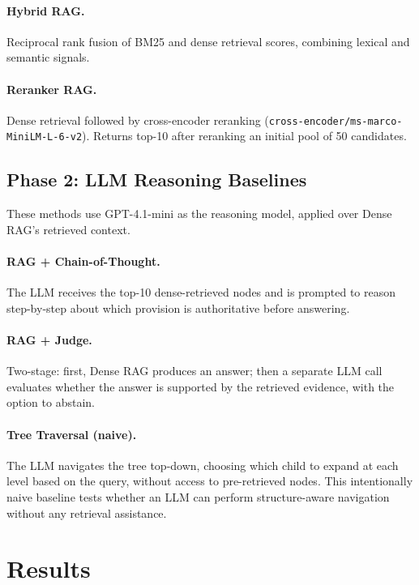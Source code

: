 \documentclass[11pt]{article}
\begin{document}
\paragraph{Hybrid RAG.} Reciprocal rank fusion of BM25 and dense retrieval scores, combining lexical and semantic signals.

\paragraph{Reranker RAG.} Dense retrieval followed by cross-encoder reranking (\texttt{cross-encoder/ms-marco-MiniLM-L-6-v2}). Returns top-10 after reranking an initial pool of 50 candidates.

\subsection{Phase 2: LLM Reasoning Baselines}

These methods use GPT-4.1-mini as the reasoning model, applied over Dense RAG's retrieved context.

\paragraph{RAG + Chain-of-Thought.} The LLM receives the top-10 dense-retrieved nodes and is prompted to reason step-by-step about which provision is authoritative before answering.

\paragraph{RAG + Judge.} Two-stage: first, Dense RAG produces an answer; then a separate LLM call evaluates whether the answer is supported by the retrieved evidence, with the option to abstain.

\paragraph{Tree Traversal (naive).} The LLM navigates the tree top-down, choosing which child to expand at each level based on the query, without access to pre-retrieved nodes. This intentionally naive baseline tests whether an LLM can perform structure-aware navigation without any retrieval assistance.


\section{Results}
\label{sec:results}
\end{document}
